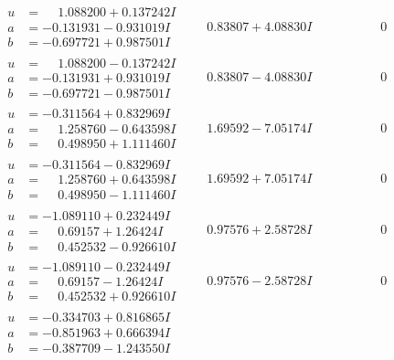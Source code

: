 \documentclass[1p]{elsarticle_modified}
\theoremstyle{definition}
\begin{document}
$$\begin{array}{c|c|c}
\begin{aligned}
u &= \phantom{-}1.088200 + 0.137242 I \\
a &= -0.131931 - 0.931019 I \\
b &= -0.697721 + 0.987501 I\end{aligned}
 & \phantom{-}0.83807 + 4.08830 I & \phantom{-0.000000 } 0 \\ \hline\begin{aligned}
u &= \phantom{-}1.088200 - 0.137242 I \\
a &= -0.131931 + 0.931019 I \\
b &= -0.697721 - 0.987501 I\end{aligned}
 & \phantom{-}0.83807 - 4.08830 I & \phantom{-0.000000 } 0 \\ \hline\begin{aligned}
u &= -0.311564 + 0.832969 I \\
a &= \phantom{-}1.258760 - 0.643598 I \\
b &= \phantom{-}0.498950 + 1.111460 I\end{aligned}
 & \phantom{-}1.69592 - 7.05174 I & \phantom{-0.000000 } 0 \\ \hline\begin{aligned}
u &= -0.311564 - 0.832969 I \\
a &= \phantom{-}1.258760 + 0.643598 I \\
b &= \phantom{-}0.498950 - 1.111460 I\end{aligned}
 & \phantom{-}1.69592 + 7.05174 I & \phantom{-0.000000 } 0 \\ \hline\begin{aligned}
u &= -1.089110 + 0.232449 I \\
a &= \phantom{-}0.69157 + 1.26424 I \\
b &= \phantom{-}0.452532 - 0.926610 I\end{aligned}
 & \phantom{-}0.97576 + 2.58728 I & \phantom{-0.000000 } 0 \\ \hline\begin{aligned}
u &= -1.089110 - 0.232449 I \\
a &= \phantom{-}0.69157 - 1.26424 I \\
b &= \phantom{-}0.452532 + 0.926610 I\end{aligned}
 & \phantom{-}0.97576 - 2.58728 I & \phantom{-0.000000 } 0 \\ \hline\begin{aligned}
u &= -0.334703 + 0.816865 I \\
a &= -0.851963 + 0.666394 I \\
b &= -0.387709 - 1.243550 I\end{aligned}

\end{array}$$
\end{document}
